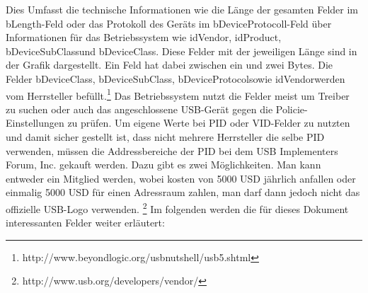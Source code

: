 Dies Umfasst die technische Informationen wie die Länge der gesamten Felder im \glqq bLength\grqq-Feld oder das Protokoll des Geräts im \glqq bDeviceProtocoll\grqq-Feld über Informationen für das Betriebssystem wie \glqq idVendor\grqq, \glqq idProduct\grqq, \glqq bDeviceSubClass\grqq und \glqq bDeviceClass\grqq. Diese Felder mit der jeweiligen Länge sind in der Grafik dargestellt. Ein Feld hat dabei zwischen ein und zwei Bytes. Die Felder \glqq bDeviceClass\grqq, \glqq bDeviceSubClass\grqq, \glqq bDeviceProtocol\grqq sowie \glqq idVendor\grqq werden vom Herrsteller befüllt.\footnote{http://www.beyondlogic.org/usbnutshell/usb5.shtml} Das Betriebssystem nutzt die Felder meist um Treiber zu suchen oder auch das angeschlossene USB-Gerät gegen die Policie-Einstellungen zu prüfen. Um eigene Werte bei PID oder VID-Felder zu nutzten und damit sicher gestellt ist, dass nicht mehrere Herrsteller die selbe PID verwenden, müssen die Addressbereiche der PID bei dem USB Implementers Forum, Inc. gekauft werden. Dazu gibt es zwei Möglichkeiten. Man kann entweder ein Mitglied werden, wobei kosten von 5000 USD jährlich anfallen oder einmalig 5000 USD für einen Adressraum zahlen, man darf dann jedoch nicht das offizielle USB-Logo verwenden. \footnote{http://www.usb.org/developers/vendor/} Im folgenden werden die für dieses Dokument interessanten Felder weiter erläutert:

